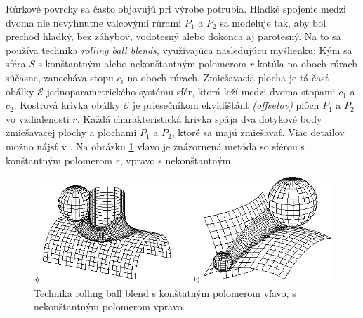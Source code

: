 Rúrkové povrchy sa často objavujú pri výrobe potrubia. Hladké spojenie medzi dvoma nie nevyhnutne valcovými rúrami $P_1$ a $P_2$ sa modeluje tak, aby bol prechod hladký, bez záhybov, vodotesný alebo dokonca aj parotesný. Na to sa používa technika \textit{rolling ball blends}, využívajúca nasledujúcu myšlienku: Kým sa sféra $S$ s konštantným alebo nekonštantným polomerom $r$ kotúľa na oboch rúrach súčasne, zanecháva stopu $c_i$ na oboch rúrach. Zmiešavacia plocha je tá časť obálky $\mathcal{E}$ jednoparametrického systému sfér, ktorá leží medzi dvoma stopami $c_1$ a $c_2$. Kostrová krivka obálky $\mathcal{E}$ je priesečníkom ekvidištánt \textit{(offsetov)} plôch $P_1$ a $P_2$ vo vzdialenosti $r$. Každá charakteristická krivka spája dva dotykové body zmiešavacej plochy a plochami $P_1$ a $P_2$, ktoré sa majú zmiešavať. Viac detailov možno nájsť v \cite{Ode20}. Na obrázku \ref{fig:rolling_ball_blends} vľavo je znázornená metóda so sférou s konštantným polomerom $r$, vpravo s nekonštantným.

\begin{figure}[H]
	\centering
	\includegraphics[width=\textwidth]{images/rolling_ball_blends.png}
	\caption[Technika rolling ball blends.]{Technika rolling ball blend s konštatným polomerom vľavo, s nekonštantným polomerom vpravo.}
	\label{fig:rolling_ball_blends}
\end{figure}
